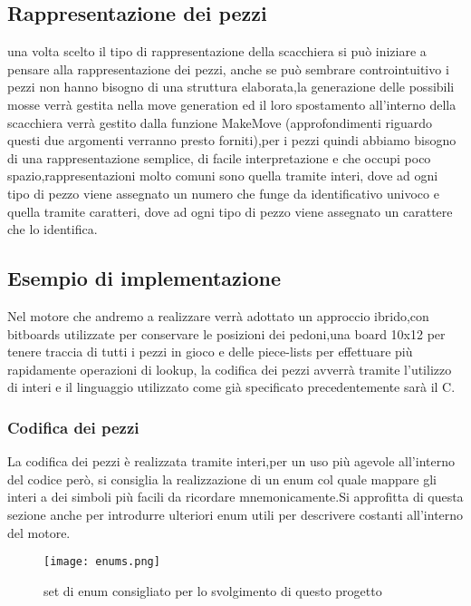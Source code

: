 \subsection{Rappresentazione dei pezzi}
una volta scelto il tipo di rappresentazione della scacchiera si può iniziare a pensare alla rappresentazione dei pezzi,
anche se può sembrare controintuitivo i pezzi non hanno bisogno di una struttura elaborata,la generazione delle possibili
mosse verrà gestita nella move generation ed il loro spostamento all'interno della scacchiera verrà gestito dalla funzione
MakeMove (approfondimenti riguardo questi due argomenti verranno presto forniti),per i pezzi quindi abbiamo bisogno di una
rappresentazione semplice, di facile interpretazione e che occupi poco spazio,rappresentazioni molto comuni sono quella
tramite interi, dove ad ogni tipo di pezzo viene assegnato un numero che funge da identificativo univoco e quella tramite
caratteri, dove ad ogni tipo di pezzo viene assegnato un carattere che lo identifica.


\subsection{Esempio di implementazione}
Nel motore che andremo a realizzare verrà adottato un approccio ibrido,con bitboards utilizzate per conservare le posizioni dei pedoni,una board 10x12 per tenere traccia di tutti i pezzi in gioco
e delle piece-lists per effettuare più rapidamente operazioni di lookup, la codifica dei pezzi avverrà tramite l'utilizzo di interi e il linguaggio utilizzato come già specificato precedentemente  sarà il C.

\subsubsection{Codifica dei pezzi} \label{codifica}
La codifica dei pezzi è realizzata tramite interi,per un uso più agevole all'interno del codice però, si consiglia la realizzazione
di un enum col quale mappare gli interi a dei simboli più facili da ricordare mnemonicamente.Si approfitta di questa sezione anche per introdurre
ulteriori enum utili per descrivere costanti all'interno del motore.
\begin{figure}[!ht]
    \texttt{[image: enums.png]}
    \caption{set di enum consigliato per lo svolgimento di questo progetto }
    \label{enums}
\end{figure}


